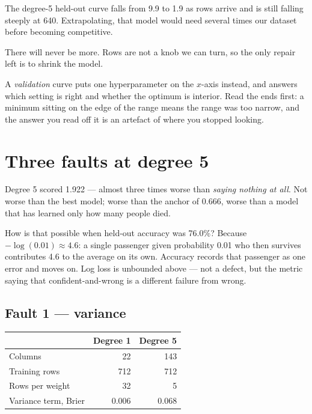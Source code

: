 \documentclass[11pt,a4paper]{article}
\begin{document}
The degree-5 held-out curve falls from 9.9 to 1.9 as rows arrive and is still
falling steeply at 640. Extrapolating, that model would need several times our
dataset before becoming competitive.

\begin{failbox}[title={There are 891 passengers on the Titanic}]
There will never be more. Rows are not a knob we can turn, so the only repair
left is to shrink the model.
\end{failbox}

A \emph{validation} curve puts one hyperparameter on the $x$-axis instead, and
answers which setting is right and whether the optimum is interior. Read the
ends first: a minimum sitting on the edge of the range means the range was too
narrow, and the answer you read off it is an artefact of where you stopped
looking.

\section{Three faults at degree 5}

Degree 5 scored 1.922 --- almost three times worse than \emph{saying nothing at
all}. Not worse than the best model; worse than the anchor of 0.666, worse than
a model that has learned only how many people died.

How is that possible when held-out accuracy was 76.0\%? Because
$-\log(0.01) \approx 4.6$: a single passenger given probability 0.01 who then
survives contributes 4.6 to the average on its own. Accuracy records that
passenger as one error and moves on. Log loss is unbounded above --- not a
defect, but the metric saying that confident-and-wrong is a different failure
from wrong.

\subsection{Fault 1 --- variance}

\begin{center}
\small
\begin{tabular}{lrr}
\toprule
& \textbf{Degree 1} & \textbf{Degree 5} \\
\midrule
Columns              & 22 & 143 \\
Training rows        & 712 & 712 \\
Rows per weight      & 32 & 5 \\
Variance term, Brier & 0.006 & 0.068 \\
\bottomrule
\end{tabular}
\end{center}
\end{document}
